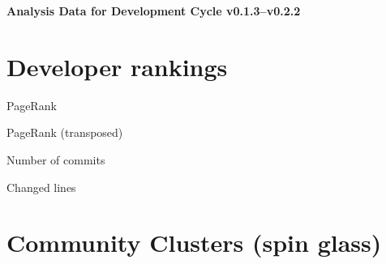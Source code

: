 \documentclass{article}
\begin{document}
\setlength{\parindent}{0pt}
\begin{center}
\begin{Large}
\textbf{Analysis Data for Development Cycle v0.1.3--v0.2.2}
\end{Large}
\end{center}
\section{Developer rankings}
\begin{small}\renewcommand{\tabcolsep}{1pt}
\begin{minipage}{0.5\linewidth}
PageRank\\

\end{minipage}%
\begin{minipage}{0.5\linewidth}
PageRank (transposed)\\

\end{minipage}

\renewcommand{\tabcolsep}{5pt}
\begin{minipage}{0.5\linewidth}
Number of commits\\

\end{minipage}%
\begin{minipage}{0.5\linewidth}
Changed lines\\

\end{minipage}
\end{small}
\newpage\section{Community Clusters (spin glass)}
\end{document}
